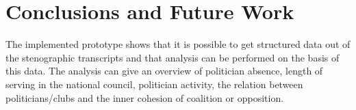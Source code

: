 \chapter{Conclusions and Future Work}
\label{chap:conclusion}

The implemented prototype shows that it is possible to get structured data out of the stenographic transcripts and that analysis can be performed on the basis of this data. The analysis can give an overview of politician absence, length of serving in the national council, politician activity, the relation between politicians/clubs and the inner cohesion of coalition or opposition.